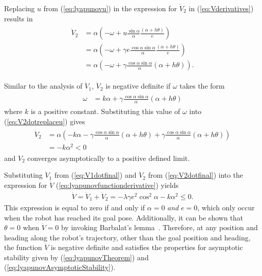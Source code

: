 Replacing $u$ from (\ref{eq:lyapunovu}) in the expression for $\dot{V}_2$ in (\ref{eq:Vderivatives}) results in
\begin{align}
\label{eq:V2dotreplaceu}
\begin{split}
\dot{V}_2 &= \alpha\left(-\omega+u\frac{\sin\alpha}{\alpha}\frac{(\alpha+h\theta)}{e}\right) \\
&= \alpha\left(-\omega+\gamma e\frac{\cos\alpha\sin\alpha}{\alpha}\frac{(\alpha+h\theta)}{e}\right) \\
&= \alpha\left(-\omega+\gamma\frac{\cos\alpha\sin\alpha}{\alpha}(\alpha+h\theta)\right).
\end{split}
\end{align}

Similar to the analysis of $\dot{V}_1$, $\dot{V}_2$ is negative definite if $\omega$ takes the form
\begin{align}
\label{eq:lyapunovomega}
\begin{split}
\omega &= k\alpha + \gamma\frac{\cos\alpha\sin\alpha}{\alpha}\left(\alpha+h\theta\right)
\end{split}
\end{align}
where $k$ is a positive constant.
Substituting this value of $\omega$ into (\ref{eq:V2dotreplaceu}) gives
\begin{align}
\label{eq:V2dotfinal}
\begin{split}
\dot{V}_2 &= \alpha\left(-k\alpha-\gamma\frac{\cos\alpha\sin\alpha}{\alpha}(\alpha+h\theta) + \gamma\frac{\cos\alpha\sin\alpha}{\alpha}(\alpha+h\theta)\right) \\
&= -k\alpha^2 < 0
\end{split}
\end{align}
and $V_2$ converges asymptotically to a positive defined limit.

Substituting $\dot{V}_1$ from (\ref{eq:V1dotfinal}) and $\dot{V}_2$ from (\ref{eq:V2dotfinal}) into the expression for $\dot{V}$ (\ref{eq:lyapunovfunctionderivative}) yields
\begin{align*}
\dot{V} = \dot{V}_1 + \dot{V}_2 = -\lambda\gamma e^2\cos^2\alpha - k\alpha^2 \leq 0.
\end{align*}
This expression is equal to zero if and only if $\alpha=0$ \textit{and} $e=0$, which only occur when the robot has reached its goal pose.
Additionally, it can be shown that $\theta=0$ when $\dot{V}=0$ by invoking Barbalat's lemma~\cite{Aicardi_UnicycleLyapunov95}.
Therefore, at any position and heading along the robot's trajectory, other than the goal position and heading, the function $\dot{V}$ is negative definite and satisfies the properties for asymptotic stability given by (\ref{eq:lyapunovTheorem}) and (\ref{eq:lyapunovAsymptoticStability}).

